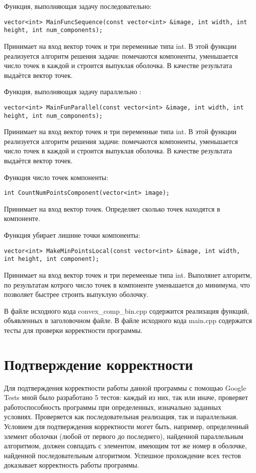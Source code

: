 \documentclass{report}
\begin{document}
\par Функция, выполняющая задачу последовательно:
\begin{lstlisting}
vector<int> MainFuncSequence(const vector<int> &image, int width, int height, int num_components);
\end{lstlisting}
Принимает на вход вектор точек и три переменные типа int. В этой функции реализуется алгоритм решения задачи: помечаются компоненты, уменьшается число точек в каждой и строится выпуклая оболочка. В качестве результата выдаётся вектор точек.
\par Функция, выполняющая задачу параллельно :
\begin{lstlisting}
vector<int> MainFunParallel(const vector<int> &image, int width, int height, int num_components);
\end{lstlisting}
Принимает на вход вектор точек и три переменные типа int. В этой функции реализуется алгоритм решения задачи: помечаются компоненты, уменьшается число точек в каждой и строится выпуклая оболочка. В качестве результата выдаётся вектор точек.
\par Функция число точек компоненты:
\begin{lstlisting}
int CountNumPointsComponent(vector<int> image);
\end{lstlisting}
Принимает на вход вектор точек. Определяет сколько точек находятся в компоненте.
\par Функция убирает лишние точки компоненты:
\begin{lstlisting}
vector<int> MakeMinPointsLocal(const vector<int> &image, int width, int height, int component);
\end{lstlisting}
Принимает на вход вектор точек и три перемееные типа int. Выполянет алгоритм, по результатам котрого число точек в компоненте уменьшается до минимума, что позволяет быстрее строить выпуклую оболочку.
\par В файле исходного кода convex\_comp\_bin.cpp содержится реализация функций, объявленных в заголовочном файле. В файле исходного кода main.cpp содержатся тесты для проверки корректности программы.
\newpage

\section*{Подтверждение корректности}
Для подтверждения корректности работы данной программы с помощью Google Tests мной было разработано 5 тестов: каждый из них, так или иначе, проверяет работоспособность программы при определенных, изначально заданных условиях. Проверяется как последовательная реализация, так и параллельная. Условием для подтверждения корректности могет быть, например, определенный элемент оболочки (любой от первого до последнего), найденной параллельным алгоритмом, должен совпадать с элементом, имеющим тот же номер в оболочке, найденной последовательным алгоритмом. Успешное прохождение всех тестов доказывает корректность работы программы.
\newpage
\end{document}
